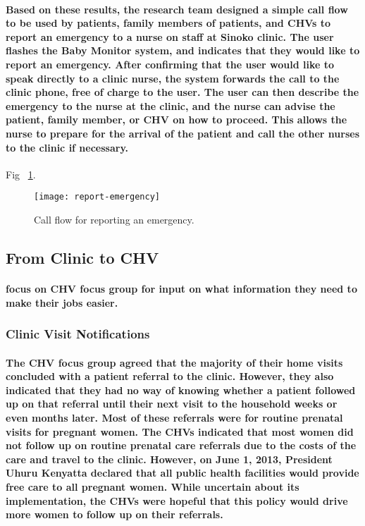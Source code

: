 \paragraph{Based on these results, the research team designed a simple call flow to be used by patients, family members of patients, and CHVs to report an emergency to a nurse on staff at Sinoko clinic. The user flashes the Baby Monitor system, and indicates that they would like to report an emergency. After confirming that the user would like to speak directly to a clinic nurse, the system forwards the call to the clinic phone, free of charge to the user. The user can then describe the emergency to the nurse at the clinic, and the nurse can advise the patient, family member, or CHV on how to proceed. This allows the nurse to prepare for the arrival of the patient and call the other nurses to the clinic if necessary.}

Fig ~\ref{fig:emergency}.
\begin{figure}[tbp]
	\begin{center}
	\texttt{[image: report-emergency]}
	\end{center}
	\caption{Call flow for reporting an emergency.}
	\label{fig:emergency}
\end{figure}

\subsection{From Clinic to CHV}
\paragraph{focus on CHV focus group for input on what information they need to make their jobs easier.}

\subsubsection{Clinic Visit Notifications}
\paragraph{The CHV focus group agreed that the majority of their home visits concluded with a patient referral to the clinic. However, they also indicated that they had no way of knowing whether a patient followed up on that referral until their next visit to the household weeks or even months later. Most of these referrals were for routine prenatal visits for pregnant women. The CHVs indicated that most women did not follow up on routine prenatal care referrals due to the costs of the care and travel to the clinic. However, on June 1, 2013, President Uhuru Kenyatta declared that all public health facilities would provide free care to all pregnant women. While uncertain about its implementation, the CHVs were hopeful that this policy would drive more women to follow up on their referrals. }


